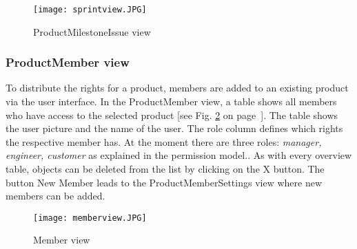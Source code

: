 \begin{figure}[h]
    \centering
    \texttt{[image: sprintview.JPG]}
    \caption{ProductMilestoneIssue view}
    \label{fig: sprintview}
\end{figure}

\subsubsection*{ProductMember view}

To distribute the rights for a product, members are added to an existing product via the user interface. In the ProductMember view, a table shows all members who have access to the selected product [see Fig. \ref{fig: memberview} on page~\pageref{fig: memberview}]. The table shows the user picture and the name of the user. The role column defines which rights the respective member has. At the moment there are three roles: \textit{manager, engineer, customer} as explained in the permission model.. As with every overview table, objects can be deleted from the list by clicking on the X button. The button New Member leads to the ProductMemberSettings view where new members can be added.

\begin{figure}[h]
    \centering
    \texttt{[image: memberview.JPG]}
    \caption{Member view}
    \label{fig: memberview}
\end{figure}